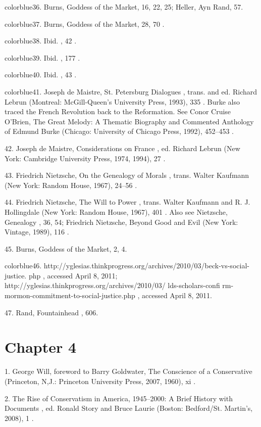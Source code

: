 	{color{blue}36}. Burns, Goddess of the Market, 16, 22, 25; Heller, Ayn Rand, 57.


	{color{blue}37}. Burns, Goddess of the Market, 28, 70 .


	{color{blue}38}. Ibid. , 42 .


	{color{blue}39}. Ibid. , 177 .


	{color{blue}40}. Ibid. , 43 .


	{color{blue}41}. Joseph de Maistre, St. Petersburg Dialogues , trans. and ed. Richard Lebrun (Montreal: McGill-Queen’s University Press, 1993), 335 . Burke also traced the French Revolution back to the Reformation. See Conor Cruise O’Brien, The Great Melody: A Thematic Biography and Commented Anthology of Edmund Burke (Chicago: University of Chicago Press, 1992), 452–453 .


	{\color{blue}42}. Joseph de Maistre, Considerations on France , ed. Richard Lebrun (New York: Cambridge University Press, 1974, 1994), 27 .


	{\color{blue}43}. Friedrich Nietzsche, On the Genealogy of Morals , trans. Walter Kaufmann (New York: Random House, 1967), 24–56 .


	{\color{blue}44}. Friedrich Nietzsche, The Will to Power , trans. Walter Kaufmann and R. J. Hollingdale (New York: Random House, 1967), 401 . Also see Nietzsche, Genealogy , 36, 54; Friedrich Nietzsche, Beyond Good and Evil (New York: Vintage, 1989), 116 .


	{\color{blue}45}. Burns, Goddess of the Market, 2, 4.


	{color{blue}46}. http://yglesias.thinkprogress.org/archives/2010/03/beck-vs-social-justice. php , accessed April 8, 2011; http://yglesias.thinkprogress.org/archives/2010/03/ lds-scholars-confi rm-mormon-commitment-to-social-justice.php , accessed April 8, 2011.


	{\color{blue}47}. Rand, Fountainhead , 606.


\section{Chapter 4}


	{\color{blue}1}. George Will, foreword to Barry Goldwater, The Conscience of a Conservative (Princeton, N,J.: Princeton University Press, 2007, 1960), xi .


	{\color{blue}2}. The Rise of Conservatism in America, 1945–2000: A Brief History with Documents , ed. Ronald Story and Bruce Laurie (Boston: Bedford/St. Martin’s, 2008), 1 .



